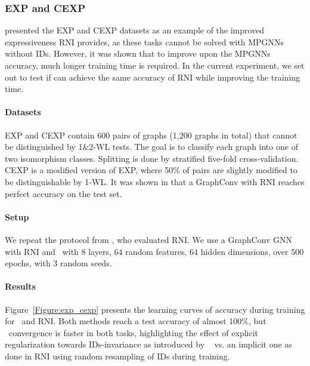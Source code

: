 \subsubsection{EXP and CEXP}
\citet{abboud2021surprisingpowergraphneural} presented the EXP and CEXP datasets as an example of the improved expressiveness RNI provides, as these tasks cannot be solved with MPGNNs without IDs. However, it was shown that to improve upon the MPGNNs accuracy, much longer training time is required. In the current experiment, we set out to test if {\ourmethod} can achieve the same accuracy of RNI while improving the training time.

\paragraph{Datasets} EXP and CEXP \citep{abboud2021surprisingpowergraphneural} contain 600 pairs of graphs (1,200 graphs in total) that cannot be distinguished by 1\&2-WL tests. The goal is to classify each graph into one of two isomorphism classes. Splitting is done by stratified five-fold cross-validation. CEXP is a modified version of EXP, where 50\% of pairs are slightly modified to be distinguishable by 1-WL. It was shown in \cite{abboud2021surprisingpowergraphneural} that a GraphConv \citep{abboud2021surprisingpowergraphneural} with RNI reaches perfect accuracy on the test set.

\paragraph{Setup}
We repeat the protocol from \citet{abboud2021surprisingpowergraphneural}, who evaluated RNI. We use a GraphConv GNN~\citep{morris2021weisfeiler} with RNI and \ourmethod~with $8$ layers, $64$ random features, $64$ hidden dimensions, over 500 epochs, with $3$ random seeds.


\paragraph{Results}
Figure~\ref{Figure:exp_cexp} presents the learning curves of accuracy during training for \ourmethod~and RNI. Both methods reach a test accuracy of almost 100\%, but \ourmethod~convergence is faster in both tasks, highlighting the effect of explicit regularization towards IDs-invariance as introduced by \ourmethod~ vs. an implicit one as done in RNI using random resampling of IDs during training.
\newline\newline 

